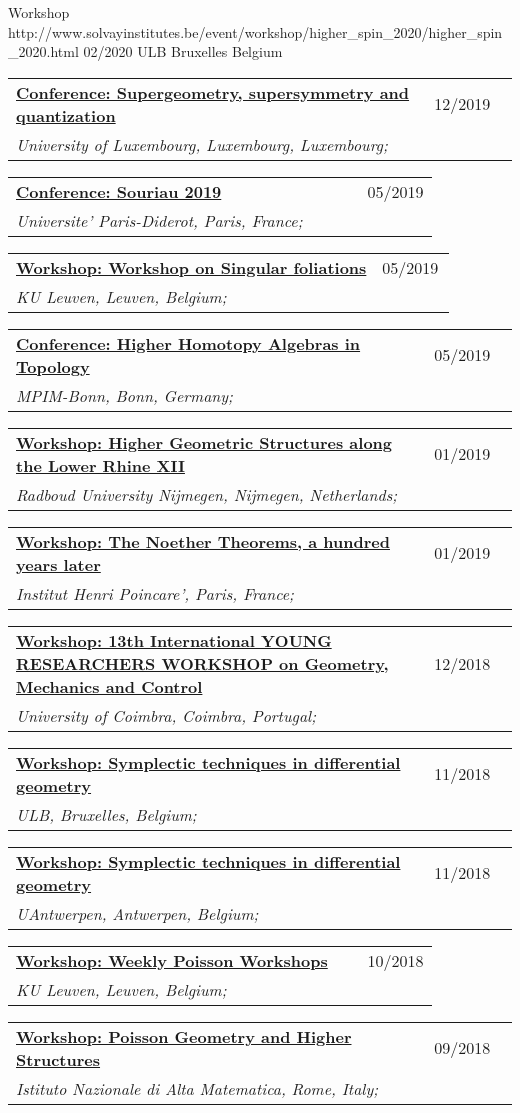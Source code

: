 \documentclass[a4paper]{article}
\newcommand{\longvoice}[8]{
	\begin{tabular}{p{0.83\linewidth} p{0.17\linewidth} }
		\textbf{\href{#3}{#2: #1}} & #4 
		\\ 
		\textit{#5, #6, #7;} & {\small\emph{#8}}
	\end{tabular}
	\vspace{.5em}
}
\begin{document}
		{Workshop}
		{http://www.solvayinstitutes.be/event/workshop/higher_spin_2020/higher_spin_2020.html}
		{02/2020}
		{ULB}
		{Bruxelles}
		{Belgium}
		{}
	\longvoice{Supergeometry, supersymmetry and quantization}
		{Conference}
		{http://math.uni.lu/SuperWork/SuperConference.html}
		{12/2019}
		{University of Luxembourg}
		{Luxembourg}
		{Luxembourg}
		{}
	\longvoice{Souriau 2019}
		{Conference}
		{https://web.archive.org/web/20190831102558/http://souriau2019.fr/?page_id=2}
		{05/2019}
		{Universite' Paris-Diderot}
		{Paris}
		{France}
		{}
	\longvoice{Workshop on Singular foliations}
		{Workshop}
		{https://wis.kuleuven.be/agenda/sem-geometry/sem-geometry-upcoming}
		{05/2019}
		{KU Leuven}
		{Leuven}
		{Belgium}
		{}
	\longvoice{Higher Homotopy Algebras in Topology}
		{Conference}
		{https://web.archive.org/web/20190831103619/https://www.mpim-bonn.mpg.de/node/9245}
		{05/2019}
		{MPIM-Bonn}
		{Bonn}
		{Germany}
		{}
	\longvoice{Higher Geometric Structures along the Lower Rhine XII}
		{Workshop}
		{https://web.archive.org/web/20190831103524/https://www.math.ru.nl/~sagave/higher-structures-XII/}
		{01/2019}
		{Radboud University Nijmegen}
		{Nijmegen}
		{Netherlands}
		{}
	\longvoice{The Noether Theorems, a hundred years later}
		{Workshop}
		{https://web.archive.org/web/20190831105634/http://noether.iecl.univ-lorraine.fr/noether_en.html}
		{01/2019}
		{Institut Henri Poincare'}
		{Paris}
		{France}
		{}
	\longvoice{13th International YOUNG RESEARCHERS WORKSHOP on Geometry, Mechanics and Control}
		{Workshop}
		{https://web.archive.org/web/20190831103121/http://www.uc.pt/en/congressos/13yrw/programa}
		{12/2018}
		{University of Coimbra}
		{Coimbra}
		{Portugal}
		{}
	\longvoice{Symplectic techniques in differential geometry}
		{Workshop}
		{https://www.uantwerpen.be/nl/personeel/sonja-hohloch/private-webpage/excellence-of-scienc/minicourses/}
		{11/2018}
		{ULB}
		{Bruxelles}
		{Belgium}
		{}
	\longvoice{Symplectic techniques in differential geometry}
		{Workshop}
		{https://www.uantwerpen.be/nl/personeel/sonja-hohloch/private-webpage/excellence-of-scienc/minicourses/}
		{11/2018}
		{UAntwerpen}
		{Antwerpen}
		{Belgium}
		{}
	\longvoice{Weekly Poisson Workshops}
		{Workshop}
		{https://wis.kuleuven.be/meetkunde/PoissonWorkingGroup}
		{10/2018}
		{KU Leuven}
		{Leuven}
		{Belgium}
		{}
	\longvoice{Poisson Geometry and Higher Structures}
		{Workshop}
		{https://web.archive.org/web/20190831103317/http://www1.mat.uniroma1.it/ricerca/convegni/2018/hippo2018/index.html}
		{09/2018}
		{Istituto Nazionale di Alta Matematica}
		{Rome}
		{Italy}
		{}
\end{document}
